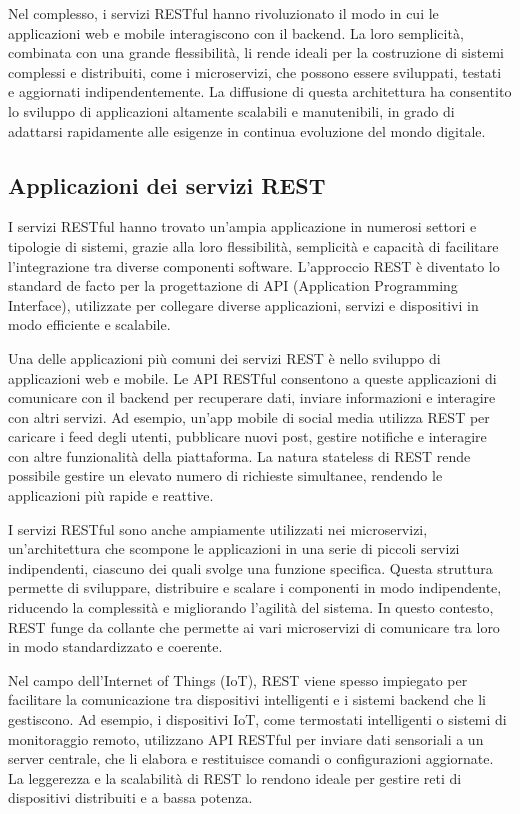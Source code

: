 \documentclass[a4paper,twoside,12pt]{toptesi}
\begin{document}
Nel complesso, i servizi RESTful hanno rivoluzionato il modo in cui le applicazioni web e mobile interagiscono con il backend. La loro semplicità, combinata con una grande flessibilità, li rende ideali per la costruzione di sistemi complessi e distribuiti, come i microservizi, che possono essere sviluppati, testati e aggiornati indipendentemente. La diffusione di questa architettura ha consentito lo sviluppo di applicazioni altamente scalabili e manutenibili, in grado di adattarsi rapidamente alle esigenze in continua evoluzione del mondo digitale.

\subsection{Applicazioni dei servizi REST}

I servizi RESTful hanno trovato un'ampia applicazione in numerosi settori e tipologie di sistemi, grazie alla loro flessibilità, semplicità e capacità di facilitare l'integrazione tra diverse componenti software. L'approccio REST è diventato lo standard de facto per la progettazione di API (Application Programming Interface), utilizzate per collegare diverse applicazioni, servizi e dispositivi in modo efficiente e scalabile.

Una delle applicazioni più comuni dei servizi REST è nello sviluppo di applicazioni web e mobile. Le API RESTful consentono a queste applicazioni di comunicare con il backend per recuperare dati, inviare informazioni e interagire con altri servizi. Ad esempio, un'app mobile di social media utilizza REST per caricare i feed degli utenti, pubblicare nuovi post, gestire notifiche e interagire con altre funzionalità della piattaforma. La natura stateless di REST rende possibile gestire un elevato numero di richieste simultanee, rendendo le applicazioni più rapide e reattive.

I servizi RESTful sono anche ampiamente utilizzati nei microservizi, un'architettura che scompone le applicazioni in una serie di piccoli servizi indipendenti, ciascuno dei quali svolge una funzione specifica. Questa struttura permette di sviluppare, distribuire e scalare i componenti in modo indipendente, riducendo la complessità e migliorando l'agilità del sistema. In questo contesto, REST funge da collante che permette ai vari microservizi di comunicare tra loro in modo standardizzato e coerente.

Nel campo dell'Internet of Things (IoT), REST viene spesso impiegato per facilitare la comunicazione tra dispositivi intelligenti e i sistemi backend che li gestiscono. Ad esempio, i dispositivi IoT, come termostati intelligenti o sistemi di monitoraggio remoto, utilizzano API RESTful per inviare dati sensoriali a un server centrale, che li elabora e restituisce comandi o configurazioni aggiornate. La leggerezza e la scalabilità di REST lo rendono ideale per gestire reti di dispositivi distribuiti e a bassa potenza.
\end{document}
